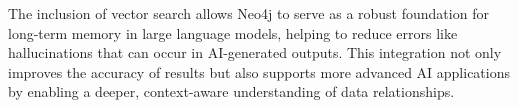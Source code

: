 The inclusion of vector search allows Neo4j to serve as a robust foundation for long-term memory in large language models, helping to reduce errors like hallucinations that can occur in AI-generated outputs. 
This integration not only improves the accuracy of results but also supports more advanced AI applications by enabling a deeper, context-aware understanding of data relationships.